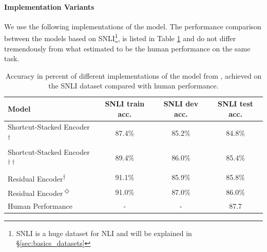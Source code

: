 \paragraph*{Implementation Variants}
We use the following implementations of the model. The performance comparison between the models based on SNLI\footnote{SNLI is a huge dataset for \ac{NLI} and will be explained in §\ref{sec:basics_datasets}}, is listed in Table \ref{table:reimplementation_performance} and do not differ tremendously from what \cite{gong2017natural} estimated to be the human performance on the same task.
\begin{table}[!htbp]
\begin{center}
\begin{tabular}{lccc}
\textbf{Model} & \textbf{SNLI train acc.} & \textbf{SNLI dev acc.} & \textbf{SNLI test acc.}\\
\toprule
Shortcut-Stacked Encoder\textsuperscript{$\dagger$} & 87.4\% & 85.2\% & 84.8\% \\
Shortcut-Stacked Encoder\textsuperscript{$\dagger\dagger$} & 89.4\% & 86.0\% & 85.4\% \\
Residual Encoder\textsuperscript{$\dagger$} & 91.1\% & 85.9\% & 85.8\% \\
Residual Encoder\textsuperscript{$\Diamond$} & 91.0\% & 87.0\% & 86.0\% \\
\midrule
Human Performance \citep{gong2017natural} & - & - & 87.7 \\
\bottomrule
\end{tabular}
\caption{Accuracy in percent of different implementations of the model from \cite{nie2017shortcut}, achieved on the SNLI dataset compared with human performance.}
\label{table:reimplementation_performance}
\end{center}
\end{table}

